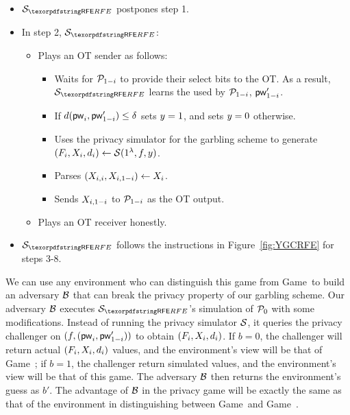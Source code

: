 \begin{games}
\begin{itemize}
\item
$\SimYGCRFE$ postpones step 1.
\item 
In step 2, $\SimYGCRFE$:
\begin{itemize}
\item Plays an OT sender as follows:
\begin{itemize}
\item Waits for $\mathcal{P}_{1-i}$ to provide their select bits to the OT.
As a result, $\SimYGCRFE$ learns the \password used by $\mathcal{P}_{1-i}$, $\mathsf{pw}_{1-i}'$.
\item If $d(\mathsf{pw}_{i}, \mathsf{pw}_{1-i}') \leq \delta$ sets $y = 1$, and sets $y = 0$ otherwise.
\item Uses the privacy simulator for the garbling scheme to generate \linebreak $(F_{i}, X_{i}, d_{i}) \gets \mathcal{S}(1^{\lambda}, f, y)$.
\item Parses $(X_{i,i}, X_{i,1-i}) \gets X_{i}$.
\item Sends $X_{i,1-i}$ to $\mathcal{P}_{1-i}$ as the OT output.
\end{itemize}
\item Plays an OT receiver honestly.
\end{itemize}
\item 
$\SimYGCRFE$ follows the instructions in Figure~\ref{fig:YGCRFE} for steps 3-8.
\end{itemize}

We can use any environment who can distinguish this game from Game~\previousgame to build an adversary $\mathcal{B}$ that can break the privacy property %
of our garbling scheme.
Our adversary $\mathcal{B}$ executes $\SimYGCRFE$'s simulation of $\mathcal{P}_{0}$ with some modifications.
Instead of running the privacy simulator $\mathcal{S}$, it queries the privacy challenger on $(f, (\mathsf{pw}_{i}, \mathsf{pw}_{1-i}'))$ to obtain $(F_{i}, X_{i}, d_{i})$.
If $b = 0$, the challenger will return actual $(F_{i}, X_{i}, d_{i})$ values, and the environment's view will be that of Game~\previousgame; if $b = 1$, the challenger return simulated values, and the environment's view will be that of this game.
The adversary $\mathcal{B}$ then returns the environment's guess as $b'$.
The advantage of $\mathcal{B}$ in the privacy game will be exactly the same as that of the environment in distinguishing between Game~\previousgame and Game~\thisgame.


\end{games}
